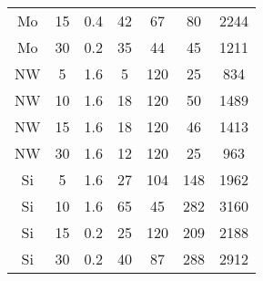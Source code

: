 \begin{table}[ht]
\begin{tabular}{ccccccc}
        Mo     & 15             & 0.4             & 42             & 67            & 80                      & 2244             \\
        Mo     & 30             & 0.2             & 35             & 44            & 45                      & 1211             \\
        NW     & 5              & 1.6             & 5              & 120           & 25                      & 834              \\
        NW     & 10             & 1.6             & 18             & 120           & 50                      & 1489             \\
        NW     & 15             & 1.6             & 18             & 120           & 46                      & 1413             \\
        NW     & 30             & 1.6             & 12             & 120           & 25                      & 963              \\
        Si     & 5              & 1.6             & 27             & 104           & 148                     & 1962             \\
        Si     & 10             & 1.6             & 65             & 45            & 282                     & 3160             \\
        Si     & 15             & 0.2             & 25             & 120           & 209                     & 2188             \\
        Si     & 30             & 0.2             & 40             & 87            & 288                     & 2912
    \end{tabular}
\end{table}